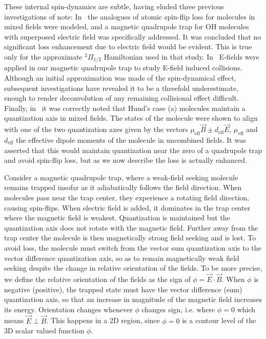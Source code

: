 \documentclass[%
 reprint,
 amsmath,amssymb,
 aps,
prl,
]{revtex4-1}
\newcommand{\red}[1]{{\color{black} #1}}
\newcommand{\epb}{{$\vec{E}\!\perp\!\vec{B}$}}
\begin{document}
These internal spin-dynamics are subtle, having eluded three previous investigations of note: In~\cite{Lara2008} the analogues of atomic spin-flip loss for molecules in mixed fields were modeled, and a magnetic quadrupole trap for OH molecules with superposed electric field was specifically addressed. It was concluded that no significant loss enhancement due to electric field would be evident. This is true only for the approximate $^2\Pi_{1/2}$ Hamiltonian used in that study. In~\cite{Stuhl2013} E-fields were applied in our magnetic quadrupole trap to study E-field induced collisions. Although an initial approximation was made of the spin-dynamical effect, subsequent investigations have revealed it to be a threefold underestimate, enough to render deconvolution of any remaining collisional effect difficult. Finally, in~\cite{Bohn2013} it was correctly noted that Hund's case (a) molecules maintain a quantization axis in mixed fields. 
\red{The states of the molecule were shown to align with one of the two quantization axes given by the vectors $\mu_\text{eff}\vec{B}\pm d_\text{eff}\vec{E}$, $\mu_\text{eff}$ and $d_\text{eff}$ the effective dipole moments of the molecule in uncombined fields. It was asserted that this would maintain quantization near the zero of a quadrupole trap and avoid spin-flip loss, but as we now describe the loss is actually enhanced.}



Consider a magnetic quadrupole trap, where a weak-field seeking molecule remains trapped insofar as it adiabatically follows the field direction. When molecules pass near the trap center, they experience a rotating field direction, causing spin-flips. When electric field is added, it dominates in the trap center where the magnetic field is weakest. Quantization is maintained but the quantization axis does not rotate with the magnetic field. Further away from the trap center the molecule is then magnetically strong field seeking and is lost. To avoid loss, the molecule must switch from the vector sum quantization axis to the vector difference quantization axis, so as to remain magnetically weak field seeking despite the change in relative orientation of the fields. To be more precise, we define the relative orientation of the fields as the sign of $\phi=\vec{E}\cdot\vec{B}$. When $\phi$ is negative (positive), the trapped state must have the vector difference (sum) quantization axis, so that an increase in magnitude of the magnetic field increases its energy. Orientation changes whenever $\phi$ changes sign, i.e. where $\phi=0$ which means \epb. This happens in a 2D region, since $\phi=0$ is a contour level of the 3D scalar valued function $\phi$. 
\end{document}
